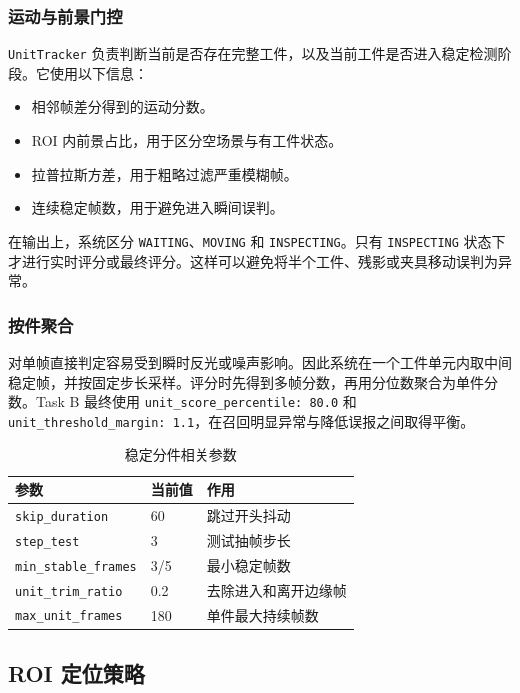 \documentclass[12pt,hyperref,a4paper,UTF8,fontset=fandol]{ctexart}
\begin{document}
\subsubsection{运动与前景门控}

\texttt{UnitTracker} 负责判断当前是否存在完整工件，以及当前工件是否进入稳定检测阶段。它使用以下信息：

\begin{itemize}
    \item 相邻帧差分得到的运动分数。
    \item ROI 内前景占比，用于区分空场景与有工件状态。
    \item 拉普拉斯方差，用于粗略过滤严重模糊帧。
    \item 连续稳定帧数，用于避免进入瞬间误判。
\end{itemize}

在输出上，系统区分 \texttt{WAITING}、\texttt{MOVING} 和 \texttt{INSPECTING}。只有 \texttt{INSPECTING} 状态下才进行实时评分或最终评分。这样可以避免将半个工件、残影或夹具移动误判为异常。

\subsubsection{按件聚合}

对单帧直接判定容易受到瞬时反光或噪声影响。因此系统在一个工件单元内取中间稳定帧，并按固定步长采样。评分时先得到多帧分数，再用分位数聚合为单件分数。Task B 最终使用 \texttt{unit\_score\_percentile: 80.0} 和 \texttt{unit\_threshold\_margin: 1.1}，在召回明显异常与降低误报之间取得平衡。

\begin{table}[H]
    \centering
    \begin{tabular}{lll}
        \toprule
        参数 & 当前值 & 作用 \\
        \midrule
        \texttt{skip\_duration} & 60 & 跳过开头抖动 \\
        \texttt{step\_test} & 3 & 测试抽帧步长 \\
        \texttt{min\_stable\_frames} & 3/5 & 最小稳定帧数 \\
        \texttt{unit\_trim\_ratio} & 0.2 & 去除进入和离开边缘帧 \\
        \texttt{max\_unit\_frames} & 180 & 单件最大持续帧数 \\
        \bottomrule
    \end{tabular}
    \caption{稳定分件相关参数}
\end{table}

\newpage
\subsection{ROI 定位策略}
\end{document}
